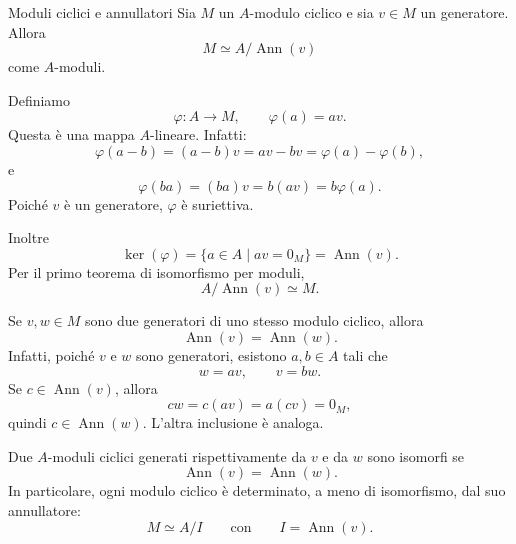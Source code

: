 \documentclass[a4paper]{article}
\begin{document}
\begin{radioactive}
\begin{snippetproposition}{Moduli ciclici e annullatori}
    Sia \(M\) un \(A\)-modulo ciclico e sia \(v\in M\) un generatore.
    Allora
    \[
        M\simeq A/\operatorname{Ann}(v)
    \]
    come \(A\)-moduli.
\end{snippetproposition}
\end{radioactive}

\begin{radioactive}
\begin{snippetproof}{}
    Definiamo
    \[
        \varphi\colon A\to M,
        \qquad
        \varphi(a)=av.
    \]
    Questa è una mappa \(A\)-lineare. Infatti:
    \[
        \varphi(a-b)=(a-b)v=av-bv=\varphi(a)-\varphi(b),
    \]
    e
    \[
        \varphi(ba)=(ba)v=b(av)=b\varphi(a).
    \]
    Poiché \(v\) è un generatore, \(\varphi\) è suriettiva.

    Inoltre
    \[
        \ker(\varphi)
        =
        \{a\in A\mid av=0_M\}
        =
        \operatorname{Ann}(v).
    \]
    Per il primo teorema di isomorfismo per moduli,
    \[
        A/\operatorname{Ann}(v)\simeq M.
    \]
\end{snippetproof}
\end{radioactive}

\begin{radioactive}
\begin{snippetremark}{}
    Se \(v,w\in M\) sono due generatori di uno stesso modulo ciclico, allora
    \[
        \operatorname{Ann}(v)=\operatorname{Ann}(w).
    \]
    Infatti, poiché \(v\) e \(w\) sono generatori, esistono \(a,b\in A\) tali che
    \[
        w=av,
        \qquad
        v=bw.
    \]
    Se \(c\in \operatorname{Ann}(v)\), allora
    \[
        cw=c(av)=a(cv)=0_M,
    \]
    quindi \(c\in \operatorname{Ann}(w)\). L'altra inclusione è analoga.
\end{snippetremark}
\end{radioactive}

\begin{radioactive}
\begin{snippetcorollary}{}
    Due \(A\)-moduli ciclici generati rispettivamente da \(v\) e da \(w\) sono isomorfi se
    \[
        \operatorname{Ann}(v)=\operatorname{Ann}(w).
    \]
    In particolare, ogni modulo ciclico è determinato, a meno di isomorfismo, dal suo annullatore:
    \[
        M\simeq A/I
        \qquad
        \text{con}
        \qquad
        I=\operatorname{Ann}(v).
    \]
\end{snippetcorollary}
\end{radioactive}
\end{document}
